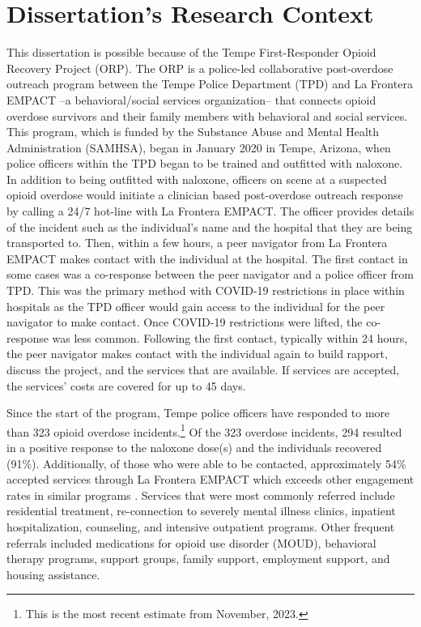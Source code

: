 \section{\centering Dissertation's Research Context}

This dissertation is possible because of the Tempe First-Responder Opioid Recovery Project (ORP). The ORP is a police-led collaborative post-overdose outreach program between the Tempe Police Department (TPD) and La Frontera EMPACT --a behavioral/social services organization-- that connects opioid overdose survivors and their family members with behavioral and social services. This program, which is funded by the Substance Abuse and Mental Health Administration (SAMHSA), began in January 2020 in Tempe, Arizona, when police officers within the TPD began to be trained and outfitted with naloxone. In addition to being outfitted with naloxone, officers on scene at a suspected opioid overdose would initiate a clinician based post-overdose outreach response by calling a 24/7 hot-line with La Frontera EMPACT. The officer provides details of the incident such as the individual's name and the hospital that they are being transported to. Then, within a few hours, a peer navigator from La Frontera EMPACT makes contact with the individual at the hospital. The first contact in some cases was a co-response between the peer navigator and a police officer from TPD. This was the primary method with COVID-19 restrictions in place within hospitals as the TPD officer would gain access to the individual for the peer navigator to make contact. Once COVID-19 restrictions were lifted, the co-response was less common. Following the first contact, typically within 24 hours, the peer navigator makes contact with the individual again to build rapport, discuss the project, and the services that are available. If services are accepted, the services' costs are covered for up to 45 days. 

Since the start of the program, Tempe police officers have responded to more than 323 opioid overdose incidents.\footnote{This is the most recent estimate from November, 2023.} Of the 323 overdose incidents, 294 resulted in a positive response to the naloxone dose(s) and the individuals recovered (91\%). Additionally, of those who were able to be contacted, approximately 54\% accepted services through La Frontera EMPACT which exceeds other engagement rates in similar programs \parencite{dahlem_beyond_2017, wagner_training_2016}. Services that were most commonly referred include residential treatment, re-connection to severely mental illness clinics, inpatient hospitalization, counseling, and intensive outpatient programs. Other frequent referrals included medications for opioid use disorder (MOUD), behavioral therapy programs, support groups, family support, employment support, and housing assistance.


